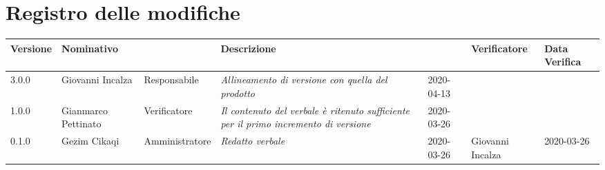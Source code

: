 \section*{Registro delle modifiche}
\renewcommand{\arraystretch}{1.8}

  \setlength\LTleft{-1.7cm}
  \begin{longtable}{|p{1.7cm}|p{2cm}|p{2.5cm}|p{3cm}|p{1.7cm}|p{2cm}|p{2.3cm}|}
    \hline

    \rowcolor{header}
    \textbf{Versione} & \textbf{Nominativo} & \centering{\textbf{Ruolo}} & \textbf{Descrizione} &      \centering{\textbf{Data}} & \textbf{Verificatore} & \textbf{Data Verifica} \\

    \hline
    3.0.0 & Giovanni Incalza & Responsabile & \small{\textit{Allineamento di versione con quella del prodotto}} & 2020-04-13 & &\\
    1.0.0 & Gianmarco Pettinato & Verificatore & \small{\textit{Il contenuto del verbale è ritenuto sufficiente per il primo incremento di versione}} & 2020-03-26 & &\\
	0.1.0 & Gezim Cikaqi & Amministratore & \small{\textit{Redatto verbale}} & 2020-03-26 & Giovanni Incalza & 2020-03-26\\
    \hline
  \end{longtable}
  \setlength\LTleft{0cm}
